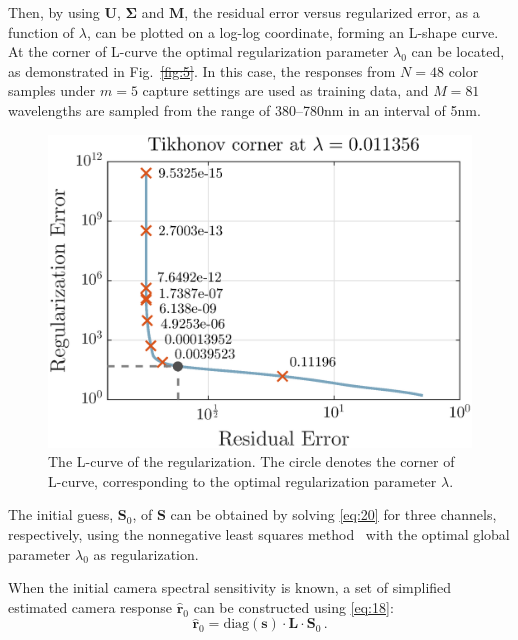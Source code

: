 \documentclass[9pt,twocolumn,twoside]{osajnl}
\providecommand{\DIFadd}[1]{{\protect\color{blue}\uwave{#1}}} %
\providecommand{\DIFdel}[1]{{\protect\color{red}\sout{#1}}}                      %
\providecommand{\DIFaddbegin}{} %
\providecommand{\DIFaddend}{} %
\providecommand{\DIFdelbegin}{} %
\providecommand{\DIFdelend}{} %
\providecommand{\DIFaddbeginFL}{} %
\providecommand{\DIFaddendFL}{} %
\providecommand{\DIFdelbeginFL}{} %
\providecommand{\DIFdelendFL}{} %
\begin{document}
Then, by using $\mathbf{U}$, $\mathbf{\Sigma}$ and $\mathbf{M}$, the residual error versus regularized error, as a function of $\lambda$, can be plotted on a log-log coordinate, forming an L-shape curve. At the corner of L-curve the optimal regularization parameter $\lambda_0$ can be located, as demonstrated in Fig.~\DIFdelbegin \DIFdel{\ref{fig:5}}\DIFdelend \DIFaddbegin \DIFadd{\ref{fig:6}}\DIFaddend . In this case, the responses from $N=48$ color samples under $m=5$ capture settings are used as training data, and $M=81$ wavelengths are sampled from the range of 380--780nm in an interval of 5nm.

\begin{figure}[tbp]
	\centering
	\DIFdelbeginFL %
\DIFdelendFL \DIFaddbeginFL \includegraphics[width=.75\linewidth]{Fig6}
	\DIFaddendFL \caption{The L-curve of the regularization. The circle denotes the corner of  L-curve, corresponding to the optimal regularization parameter $\lambda$.}
	\DIFdelbeginFL %
\DIFdelendFL \DIFaddbeginFL \label{fig:6}
\DIFaddendFL \end{figure}

The initial guess, $\mathbf{S}_0$, of $\mathbf{S}$ can be obtained by solving \eqref{eq:20} for three channels, respectively, using the nonnegative least squares method~\cite{Lawson:95} with the optimal global parameter $\lambda_0$ as regularization.

When the initial camera spectral sensitivity is known, a set of simplified estimated camera response $\hat{\mathbf{r}}_0$ can be constructed using \eqref{eq:18}:
\begin{equation}
\hat{\mathbf{r}}_0 = \text{diag}(\mathbf{s})\cdot\mathbf{L}\cdot\mathbf{S}_0\,.
\label{eq:23}
\end{equation}
\end{document}

